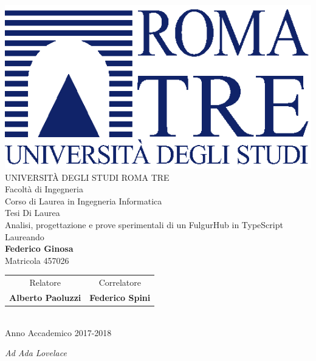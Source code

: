 \documentclass[12pt,italian,]{book}
\author{menxit}
\date{}
\begin{document}
\newcommand{\frontespizio}{
   \thispagestyle{empty}
   \begin{center}
      \vspace{10mm}
      {\includegraphics[width=0.4 \linewidth]{template/uniroma3-logo}} \\
      \vspace{10mm}
      {\Large UNIVERSIT\`A DEGLI STUDI ROMA TRE} \\
      \vspace{5mm}
      {\LARGE {Facoltà di Ingegneria}} \\
      {\Large {Corso di Laurea in Ingegneria Informatica}} \\
      \vspace{15mm}
      {\LARGE Tesi Di Laurea} \\
      \vspace{15mm}
      {\LARGE {Analisi, progettazione e prove sperimentali di un FulgurHub in TypeScript}} \\
      \vspace{15mm}
      {\large Laureando \\  \textbf{{Federico Ginosa}} \\ Matricola {457026}} \\
      \vspace{7mm}

      \begin{tabular}{c  @{\hspace{2.5cm}} c}
        Relatore & Correlatore \\
        \textbf{{Alberto Paoluzzi}} & \textbf{{Federico Spini}} \\
      \end{tabular} \\

      \vfill
      {\large Anno Accademico {2017-2018}} \\
   \end{center}
   \newpage 
}
{
  \frontespizio
}

\newcommand{\generaDedica}{
   \thispagestyle{empty}
   \null\vspace{\stretch{1}}
   \begin{flushright}
      \emph{{{Ad Ada Lovelace}}}
   \end{flushright}
   \null
}
{
\generaDedica
}
\end{document}
